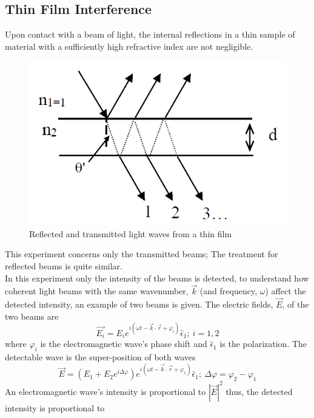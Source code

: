 \documentclass[reprint,amsmath,amssymb,aps, prl,superscriptaddress]{revtex4-2}
\begin{document}
\subsection{Thin Film Interference}
Upon contact with a beam of light, the internal reflections in a thin sample of material with a sufficiently high refractive index are not negligible.
\begin{figure}[H]
    \includegraphics[width=\linewidth]{Images/Thin film.png}
    \caption{Reflected and transmitted light waves from a thin film}
    \label{fig:ThinFilm}
\end{figure}
This experiment concerns only the transmitted beams; The treatment for reflected beams is quite similar.\\
In this experiment only the intensity of the beams is detected, to understand how coherent light beams with the same wavenumber, $\vec{k}$ (and frequency, $\omega$) affect the detected intensity, an example of two beams is given. 
The electric fields, $\vec{E}$, of the two beams are
\begin{equation*}
    \vec{E_{i}}=E_{i}e^{i(\omega t - \vec{k}\cdot\vec{r} + \varphi_i)}\hat{\epsilon}_1;\ i=1,2
\end{equation*}
where $\varphi_i$ is the electromagnetic wave's phase shift and $\hat{\epsilon}_1$ is the polarization.
The detectable wave is the super-position of both waves
\begin{equation*}
    \vec{E} = (E_{1}+E_{2}e^{i\Delta\varphi})e^{i(\omega t - \vec{k}\cdot\vec{r} + \varphi_1)}\hat{\epsilon}_1;\ \Delta\varphi=\varphi_2-\varphi_1
\end{equation*}
An electromagnetic wave's intensity is proportional to $|\vec{E}|^2$ thus, the detected intensity is proportional to 
\end{document}

